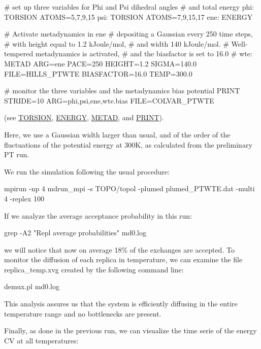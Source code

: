 \begin{DoxyVerb}# set up three variables for Phi and Psi dihedral angles
# and total energy
phi: TORSION ATOMS=5,7,9,15
psi: TORSION ATOMS=7,9,15,17
ene: ENERGY

# Activate metadynamics in ene
# depositing a Gaussian every 250 time steps,
# with height equal to 1.2 kJoule/mol,
# and width 140 kJoule/mol.
# Well-tempered metadynamics is activated,
# and the biasfactor is set to 16.0
#
wte: METAD ARG=ene PACE=250 HEIGHT=1.2 SIGMA=140.0 FILE=HILLS_PTWTE BIASFACTOR=16.0 TEMP=300.0

# monitor the three variables and the metadynamics bias potential
PRINT STRIDE=10 ARG=phi,psi,ene,wte.bias FILE=COLVAR_PTWTE\end{DoxyVerb}
 (see \hyperlink{TORSION}{T\+O\+R\+S\+I\+O\+N}, \hyperlink{ENERGY}{E\+N\+E\+R\+G\+Y}, \hyperlink{METAD}{M\+E\+T\+A\+D}, and \hyperlink{PRINT}{P\+R\+I\+N\+T}).

Here, we use a Gaussian width larger than usual, and of the order of the fluctuations of the potential energy at 300\+K, as calculated from the preliminary P\+T run.

We run the simulation following the usual procedure\+:

\begin{DoxyVerb} mpirun -np 4 mdrun_mpi -s TOPO/topol -plumed plumed_PTWTE.dat -multi 4 -replex 100
\end{DoxyVerb}


If we analyze the average acceptance probability in this run\+:

\begin{DoxyVerb}grep -A2 "Repl  average probabilities" md0.log
\end{DoxyVerb}


we will notice that now on average 18\% of the exchanges are accepted. To monitor the diffusion of each replica in temperature, we can examine the file replica\+\_\+temp.\+xvg created by the following command line\+:

\begin{DoxyVerb}demux.pl md0.log
\end{DoxyVerb}


This analysis assures us that the system is efficiently diffusing in the entire temperature range and no bottlenecks are present.

\label{belfast-7_belfast-7-ptwtediff-fig}%
\hypertarget{belfast-7_belfast-7-ptwtediff-fig}{}%
 Finally, as done in the previous run, we can visualize the time serie of the energy C\+V at all temperatures\+:

